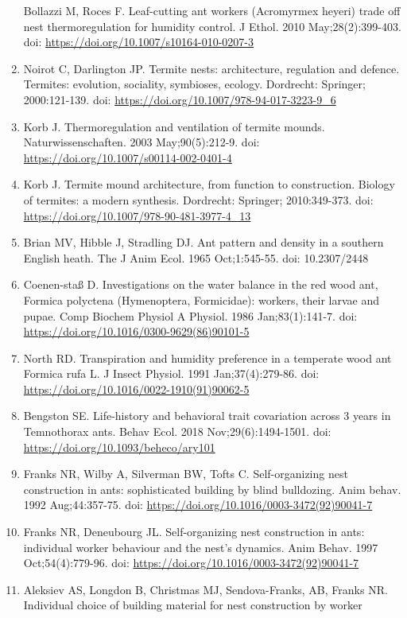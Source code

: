 \documentclass[3p]{elsarticle} %
\begin{document}
\begin{enumerate}
  Bollazzi M, Roces F. Leaf-cutting ant workers (Acromyrmex heyeri)
  trade off nest thermoregulation for humidity control. J Ethol. 2010
  May;28(2):399-403. doi:
  \url{https://doi.org/10.1007/s10164-010-0207-3}
\item
  Noirot C, Darlington JP. Termite nests: architecture, regulation and
  defence. Termites: evolution, sociality, symbioses, ecology.
  Dordrecht: Springer; 2000:121-139. doi:
  \url{https://doi.org/10.1007/978-94-017-3223-9_6}
\item
  Korb J. Thermoregulation and ventilation of termite mounds.
  Naturwissenschaften. 2003 May;90(5):212-9. doi:
  \url{https://doi.org/10.1007/s00114-002-0401-4}
\item
  Korb J. Termite mound architecture, from function to construction.
  Biology of termites: a modern synthesis. Dordrecht: Springer;
  2010:349-373. doi: \url{https://doi.org/10.1007/978-90-481-3977-4_13}
\item
  Brian MV, Hibble J, Stradling DJ. Ant pattern and density in a
  southern English heath. The J Anim Ecol. 1965 Oct;1:545-55. doi:
  10.2307/2448
\item
  Coenen-staß D. Investigations on the water balance in the red wood
  ant, Formica polyctena (Hymenoptera, Formicidae): workers, their
  larvae and pupae. Comp Biochem Physiol A Physiol. 1986
  Jan;83(1):141-7. doi:
  \url{https://doi.org/10.1016/0300-9629(86)90101-5}
\item
  North RD. Transpiration and humidity preference in a temperate wood
  ant Formica rufa L. J Insect Physiol. 1991 Jan;37(4):279-86. doi:
  \url{https://doi.org/10.1016/0022-1910(91)90062-5}
\item
  Bengston SE. Life-history and behavioral trait covariation across 3
  years in Temnothorax ants. Behav Ecol. 2018 Nov;29(6):1494-1501. doi:
  \url{https://doi.org/10.1093/beheco/ary101}
\item
  Franks NR, Wilby A, Silverman BW, Tofts C. Self-organizing nest
  construction in ants: sophisticated building by blind bulldozing. Anim
  behav. 1992 Aug;44:357-75. doi:
  \url{https://doi.org/10.1016/0003-3472(92)90041-7}
\item
  Franks NR, Deneubourg JL. Self-organizing nest construction in ants:
  individual worker behaviour and the nest's dynamics. Anim Behav. 1997
  Oct;54(4):779-96. doi:
  \url{https://doi.org/10.1016/0003-3472(92)90041-7}
\item
  Aleksiev AS, Longdon B, Christmas MJ, Sendova-Franks, AB, Franks NR.
  Individual choice of building material for nest construction by worker

\end{enumerate}
\end{document}
